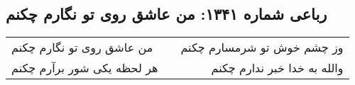 \begin{center}
\section*{رباعی شماره ۱۳۴۱: من عاشق روی تو نگارم چکنم}
\label{sec:1341}
\begin{longtable}{l p{0.5cm} r}
من عاشق روی تو نگارم چکنم
&&
وز چشم خوش تو شرمسارم چکنم
\\
هر لحظه یکی شور برآرم چکنم
&&
والله به خدا خبر ندارم چکنم
\\
\end{longtable}
\end{center}
